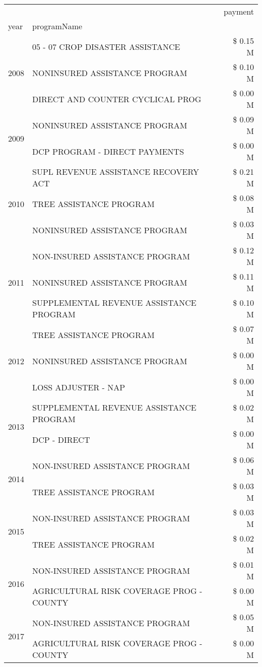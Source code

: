 \begin{tabular}{llr}
\toprule
 &  & payment \\
year & programName &  \\
\midrule
\multirow[t]{3}{*}{2008} & 05 - 07 CROP DISASTER ASSISTANCE & \$ 0.15 M \\
 & NONINSURED ASSISTANCE PROGRAM & \$ 0.10 M \\
 & DIRECT AND COUNTER CYCLICAL PROG & \$ 0.00 M \\
\cline{1-3}
\multirow[t]{2}{*}{2009} & NONINSURED ASSISTANCE PROGRAM & \$ 0.09 M \\
 & DCP PROGRAM - DIRECT PAYMENTS & \$ 0.00 M \\
\cline{1-3}
\multirow[t]{3}{*}{2010} & SUPL REVENUE ASSISTANCE RECOVERY ACT & \$ 0.21 M \\
 & TREE ASSISTANCE PROGRAM & \$ 0.08 M \\
 & NONINSURED ASSISTANCE PROGRAM & \$ 0.03 M \\
\cline{1-3}
\multirow[t]{3}{*}{2011} & NON-INSURED ASSISTANCE PROGRAM & \$ 0.12 M \\
 & NONINSURED ASSISTANCE PROGRAM & \$ 0.11 M \\
 & SUPPLEMENTAL REVENUE ASSISTANCE PROGRAM & \$ 0.10 M \\
\cline{1-3}
\multirow[t]{3}{*}{2012} & TREE ASSISTANCE PROGRAM & \$ 0.07 M \\
 & NONINSURED ASSISTANCE PROGRAM & \$ 0.00 M \\
 & LOSS ADJUSTER - NAP & \$ 0.00 M \\
\cline{1-3}
\multirow[t]{2}{*}{2013} & SUPPLEMENTAL REVENUE ASSISTANCE PROGRAM & \$ 0.02 M \\
 & DCP - DIRECT & \$ 0.00 M \\
\cline{1-3}
\multirow[t]{2}{*}{2014} & NON-INSURED ASSISTANCE PROGRAM & \$ 0.06 M \\
 & TREE ASSISTANCE PROGRAM & \$ 0.03 M \\
\cline{1-3}
\multirow[t]{2}{*}{2015} & NON-INSURED ASSISTANCE PROGRAM & \$ 0.03 M \\
 & TREE ASSISTANCE PROGRAM & \$ 0.02 M \\
\cline{1-3}
\multirow[t]{2}{*}{2016} & NON-INSURED ASSISTANCE PROGRAM & \$ 0.01 M \\
 & AGRICULTURAL RISK COVERAGE PROG - COUNTY & \$ 0.00 M \\
\cline{1-3}
\multirow[t]{2}{*}{2017} & NON-INSURED ASSISTANCE PROGRAM & \$ 0.05 M \\
 & AGRICULTURAL RISK COVERAGE PROG - COUNTY & \$ 0.00 M \\

\end{tabular}
